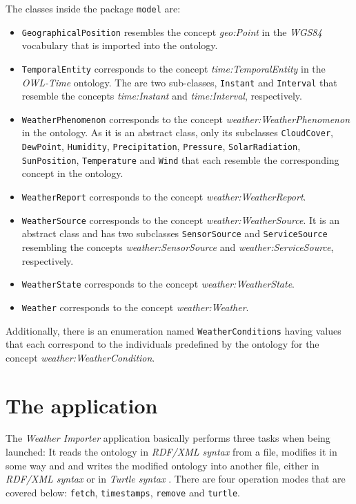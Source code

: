 The classes inside the package \texttt{model} are:
\begin{itemize}
  \item \texttt{GeographicalPosition} resembles the concept \emph{geo:Point} in the \emph{WGS84} vocabulary that is imported into the \thinkhomeweather ontology.
  \item \texttt{TemporalEntity} corresponds to the concept \emph{time:TemporalEntity} in the \emph{OWL-Time} ontology. The are two sub-classes, \texttt{Instant} and \texttt{Interval} that resemble the concepts \emph{time:Instant} and \emph{time:Interval}, respectively.
  \item \texttt{WeatherPhenomenon} corresponds to the concept \emph{weather:WeatherPhenomenon} in the \thinkhomeweather ontology. As it is an abstract class, only its subclasses \texttt{CloudCover}, \texttt{DewPoint}, \texttt{Humidity}, \texttt{Precipitation}, \texttt{Pressure}, \texttt{SolarRadiation}, \texttt{SunPosition}, \texttt{Temperature} and \texttt{Wind} that each resemble the corresponding concept in the ontology.
  \item \texttt{WeatherReport} corresponds to the concept \emph{weather:WeatherReport}.
  \item \texttt{WeatherSource} corresponds to the concept \emph{weather:WeatherSource}. It is an abstract class and has two subclasses \texttt{SensorSource} and \texttt{ServiceSource} resembling the concepts \emph{weather:SensorSource} and \emph{weather:ServiceSource}, respectively.
  \item \texttt{WeatherState} corresponds to the concept \emph{weather:WeatherState}.
  \item \texttt{Weather} corresponds to the concept \emph{weather:Weather}.
\end{itemize}

Additionally, there is an enumeration named \texttt{WeatherConditions} having values that each correspond to the individuals predefined by the ontology for the concept \emph{weather:WeatherCondition}.

\section{The application}
\label{sec:importer_application}

The \emph{Weather Importer} application basically performs three tasks when being launched: It reads the \thinkhomeweather ontology in \emph{RDF/XML syntax}\cite{RDF_XML} from a file, modifies it in some way and and writes the modified ontology into another file, either in \emph{RDF/XML syntax} or in \emph{Turtle syntax} \cite{Turtle}. There are four operation modes that are covered below: \texttt{fetch}, \texttt{timestamps}, \texttt{remove} and \texttt{turtle}.

